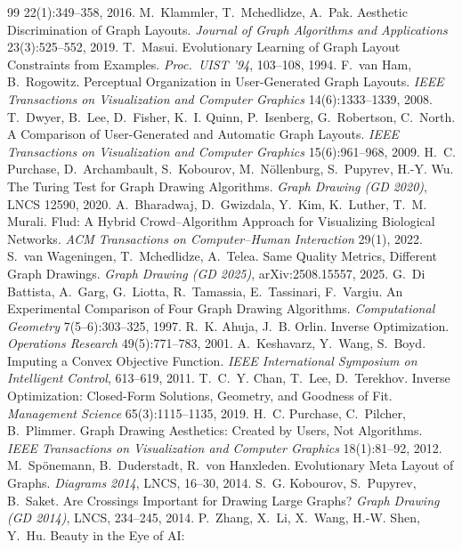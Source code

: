 \documentclass[11pt]{article}
\begin{document}
\begin{thebibliography}{99}
 22(1):349--358, 2016.
 M.~Klammler, T.~Mchedlidze, A.~Pak. Aesthetic Discrimination of Graph
 Layouts. \emph{Journal of Graph Algorithms and Applications} 23(3):525--552, 2019.
 T.~Masui. Evolutionary Learning of Graph Layout Constraints from
 Examples. \emph{Proc.\ UIST '94}, 103--108, 1994.
 F.~van Ham, B.~Rogowitz. Perceptual Organization in User-Generated Graph
 Layouts. \emph{IEEE Transactions on Visualization and Computer Graphics} 14(6):1333--1339,
 2008.
 T.~Dwyer, B.~Lee, D.~Fisher, K.~I. Quinn, P.~Isenberg, G.~Robertson,
 C.~North. A Comparison of User-Generated and Automatic Graph Layouts. \emph{IEEE
 Transactions on Visualization and Computer Graphics} 15(6):961--968, 2009.
 H.~C. Purchase, D.~Archambault, S.~Kobourov, M.~N\"ollenburg,
 S.~Pupyrev, H.-Y. Wu. The Turing Test for Graph Drawing Algorithms. \emph{Graph Drawing
 (GD 2020)}, LNCS 12590, 2020.
 A.~Bharadwaj, D.~Gwizdala, Y.~Kim, K.~Luther, T.~M. Murali. Flud: A Hybrid
 Crowd--Algorithm Approach for Visualizing Biological Networks. \emph{ACM Transactions on
 Computer--Human Interaction} 29(1), 2022.
 S.~van Wageningen, T.~Mchedlidze, A.~Telea. Same Quality Metrics,
 Different Graph Drawings. \emph{Graph Drawing (GD 2025)}, arXiv:2508.15557, 2025.
 G.~Di Battista, A.~Garg, G.~Liotta, R.~Tamassia, E.~Tassinari, F.~Vargiu.
 An Experimental Comparison of Four Graph Drawing Algorithms. \emph{Computational
 Geometry} 7(5--6):303--325, 1997.
 R.~K. Ahuja, J.~B. Orlin. Inverse Optimization. \emph{Operations
 Research} 49(5):771--783, 2001.
 A.~Keshavarz, Y.~Wang, S.~Boyd. Imputing a Convex Objective Function.
 \emph{IEEE International Symposium on Intelligent Control}, 613--619, 2011.
 T.~C.~Y. Chan, T.~Lee, D.~Terekhov. Inverse Optimization: Closed-Form
 Solutions, Geometry, and Goodness of Fit. \emph{Management Science} 65(3):1115--1135,
 2019.
 H.~C. Purchase, C.~Pilcher, B.~Plimmer. Graph Drawing Aesthetics:
 Created by Users, Not Algorithms. \emph{IEEE Transactions on Visualization and Computer
 Graphics} 18(1):81--92, 2012.
 M.~Sp\"onemann, B.~Duderstadt, R.~von Hanxleden. Evolutionary Meta
 Layout of Graphs. \emph{Diagrams 2014}, LNCS, 16--30, 2014.
 S.~G. Kobourov, S.~Pupyrev, B.~Saket. Are Crossings Important for
 Drawing Large Graphs? \emph{Graph Drawing (GD 2014)}, LNCS, 234--245, 2014.
 P.~Zhang, X.~Li, X.~Wang, H.-W. Shen, Y.~Hu. Beauty in the Eye of AI:

\end{thebibliography}
\end{document}
